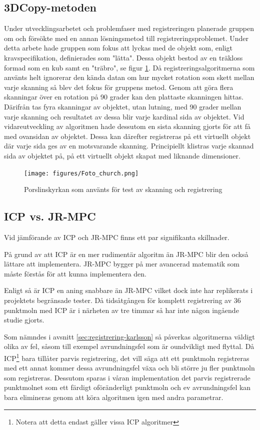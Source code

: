 \subsection{3DCopy-metoden}
Under utvecklingsarbetet och problemfaser med registreringen planerade gruppen om och försökte med en annan lösningsmetod till registreringsproblemet. Under detta arbete hade gruppen som fokus att lyckas med de objekt som, enligt kravspecifikation, definierades som "lätta". Dessa objekt bestod av en träkloss formad som en kub samt en "träbro", se figur \ref{fig:foto_church}. Då registreringsalgoritmerna som använts helt ignorerar den kända datan om hur mycket rotation som skett mellan varje skanning så blev det fokus för gruppens metod. Genom att göra flera skanningar över en rotation på 90 grader kan den plattaste skanningen hittas. Därifrån tas fyra skanningar av objektet, utan lutning, med 90 grader mellan varje skanning och resultatet av dessa blir varje kardinal sida av objektet. Vid vidareutveckling av algoritmen hade dessutom en sista skanning gjorts för att få med ovansidan av objektet. Dessa kan därefter registreras på ett virtuellt objekt där varje sida ges av en motsvarande skanning. Principiellt klistras varje skannad sida av objektet på, på ett virtuellt objekt skapat med liknande dimensioner. 

\begin{figure}[H]
	\centering
	\texttt{[image: figures/Foto\_church.png]}
	\caption{Porslinskyrkan som använts för test av skanning och registrering}
	\label{fig:foto_church}
\end{figure}

\subsection{ICP vs. JR-MPC}

Vid jämförande av ICP och JR-MPC finns ett par signifikanta skillnader. 

På grund av att ICP är en mer rudimentär algoritm än JR-MPC blir den också lättare att implementera. JR-MPC bygger på mer avancerad matematik som måste förstås för att kunna implementera den.

Enligt \cite{Evangelidis-ECCV-2014} så är ICP en aning snabbare än JR-MPC vilket dock inte har replikerats i projektets begränsade tester. Då tidsåtgången för komplett registrering av 36 punktmoln med ICP är i närheten av tre timmar så har inte någon ingående studie gjorts. 

Som nämndes i avsnitt \ref{sec:registrering-karlsson} så påverkas algoritmerna väldigt olika av fel, såsom till exempel avrundningsfel som är oundvikligt med flyttal. Då ICP\footnote{Notera att detta endast gäller vissa ICP algoritmer} bara tillåter parvis registrering, det vill säga att ett punktmoln registreras med ett annat kommer dessa avrundningsfel växa och bli större ju fler punktmoln som registreras. Dessutom sparas i våran implementation det parvis registrerade punktmolnet som ett färdigt oföränderligt punktmoln och ev avrundningsfel kan bara elimineras genom att köra algoritmen igen med andra parametrar.

